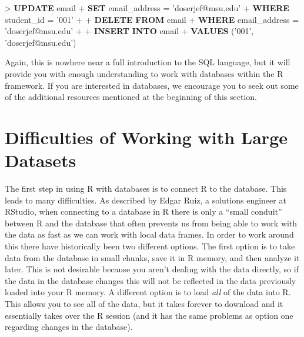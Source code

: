 \documentclass[]{krantz}
\makeatletter
\newenvironment{Shaded}{\begin{snugshade}}{\end{snugshade}}
\newcommand{\KeywordTok}[1]{\textcolor[rgb]{0.27,0.27,0.27}{\textbf{#1}}}
\newcommand{\NormalTok}[1]{#1}
\newcommand{\StringTok}[1]{\textcolor[rgb]{0.5,0.5,0.5}{#1}}
\newenvironment{kframe}{%
\medskip{}
\setlength{\fboxsep}{.8em}
 \def\at@end@of@kframe{}%
 \ifinner\ifhmode%
  \def\at@end@of@kframe{\end{minipage}}%
  \begin{minipage}{\columnwidth}%
 \fi\fi%
 \def\FrameCommand##1{\hskip\@totalleftmargin \hskip-\fboxsep
 \colorbox{shadecolor}{##1}\hskip-\fboxsep
     \hskip-\linewidth \hskip-\@totalleftmargin \hskip\columnwidth}%
 \MakeFramed {\advance\hsize-\width
   \@totalleftmargin\z@ \linewidth\hsize
   \@setminipage}}%
 {\par\unskip\endMakeFramed%
 \at@end@of@kframe}
\renewenvironment{Shaded}{\begin{kframe}}{\end{kframe}}
\makeatother
\begin{document}
\begin{Shaded}
\begin{Highlighting}[]
\NormalTok{> }\KeywordTok{UPDATE}\NormalTok{ email}
\NormalTok{+ }\KeywordTok{SET}\NormalTok{ email_address = }\StringTok{'doserjef@msu.edu'}
\NormalTok{+ }\KeywordTok{WHERE}\NormalTok{ student_id = }\StringTok{'001'}
\NormalTok{+ }
\NormalTok{+ }\KeywordTok{DELETE} \KeywordTok{FROM}\NormalTok{ email}
\NormalTok{+ }\KeywordTok{WHERE}\NormalTok{ email_address = }\StringTok{'doserjef@msu.edu'}
\NormalTok{+ }
\NormalTok{+ }\KeywordTok{INSERT} \KeywordTok{INTO}\NormalTok{ email}
\NormalTok{+ }\KeywordTok{VALUES}\NormalTok{ (}\StringTok{'001'}\NormalTok{, }\StringTok{'doserjef@msu.edu'}\NormalTok{)}
\end{Highlighting}
\end{Shaded}

Again, this is nowhere near a full introduction to the SQL language, but it will provide you with enough understanding to work with databases within the R framework. If you are interested in databases, we encourage you to seek out some of the additional resources mentioned at the beginning of this section.

\hypertarget{difficulties-of-working-with-large-datasets}{%
\section{Difficulties of Working with Large Datasets}\label{difficulties-of-working-with-large-datasets}}

The first step in using R with databases is to connect R to the database. This leads to many difficulties. As described by Edgar Ruiz, a solutions engineer at RStudio, when connecting to a database in R there is only a ``small conduit'' between R and the database that often prevents us from being able to work with the data as fast as we can work with local data frames. In order to work around this there have historically been two different options. The first option is to take data from the database in small chunks, save it in R memory, and then analyze it later. This is not desirable because you aren't dealing with the data directly, so if the data in the database changes this will not be reflected in the data previously loaded into your R memory. A different option is to load \emph{all} of the data into R. This allows you to see all of the data, but it takes forever to download and it essentially takes over the R session (and it has the same problems as option one regarding changes in the database).
\end{document}
